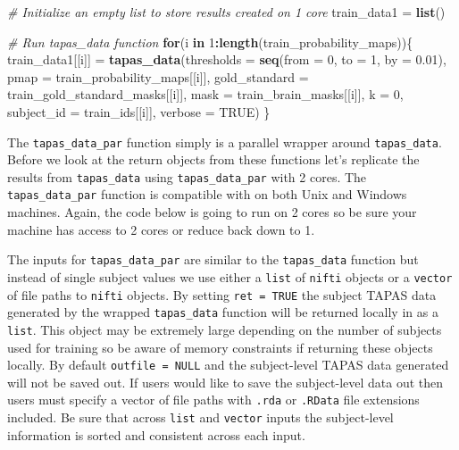 \documentclass[]{article}
\newenvironment{Shaded}{\begin{snugshade}}{\end{snugshade}}
\newcommand{\CommentTok}[1]{\textcolor[rgb]{0.56,0.35,0.01}{\textit{#1}}}
\newcommand{\ControlFlowTok}[1]{\textcolor[rgb]{0.13,0.29,0.53}{\textbf{#1}}}
\newcommand{\DataTypeTok}[1]{\textcolor[rgb]{0.13,0.29,0.53}{#1}}
\newcommand{\DecValTok}[1]{\textcolor[rgb]{0.00,0.00,0.81}{#1}}
\newcommand{\FloatTok}[1]{\textcolor[rgb]{0.00,0.00,0.81}{#1}}
\newcommand{\KeywordTok}[1]{\textcolor[rgb]{0.13,0.29,0.53}{\textbf{#1}}}
\newcommand{\NormalTok}[1]{#1}
\newcommand{\OperatorTok}[1]{\textcolor[rgb]{0.81,0.36,0.00}{\textbf{#1}}}
\newcommand{\OtherTok}[1]{\textcolor[rgb]{0.56,0.35,0.01}{#1}}
\newcommand{\StringTok}[1]{\textcolor[rgb]{0.31,0.60,0.02}{#1}}
\begin{document}
\begin{Shaded}
\begin{Highlighting}[]
\CommentTok{# Initialize an empty list to store results created on 1 core}
\NormalTok{train_data1 =}\StringTok{ }\KeywordTok{list}\NormalTok{()}

\CommentTok{# Run tapas_data function}
\ControlFlowTok{for}\NormalTok{(i }\ControlFlowTok{in} \DecValTok{1}\OperatorTok{:}\KeywordTok{length}\NormalTok{(train_probability_maps))\{}
\NormalTok{  train_data1[[i]] =}\StringTok{ }\KeywordTok{tapas_data}\NormalTok{(}\DataTypeTok{thresholds =} \KeywordTok{seq}\NormalTok{(}\DataTypeTok{from =} \DecValTok{0}\NormalTok{, }\DataTypeTok{to =} \DecValTok{1}\NormalTok{, }\DataTypeTok{by =} \FloatTok{0.01}\NormalTok{),}
                         \DataTypeTok{pmap =}\NormalTok{ train_probability_maps[[i]],}
                         \DataTypeTok{gold_standard =}\NormalTok{ train_gold_standard_masks[[i]],}
                         \DataTypeTok{mask =}\NormalTok{ train_brain_masks[[i]],}
                         \DataTypeTok{k =} \DecValTok{0}\NormalTok{,}
                         \DataTypeTok{subject_id =}\NormalTok{ train_ids[[i]],}
                         \DataTypeTok{verbose =} \OtherTok{TRUE}\NormalTok{)}
\NormalTok{\}}
\end{Highlighting}
\end{Shaded}

The \texttt{tapas\_data\_par} function simply is a parallel wrapper
around \texttt{tapas\_data}. Before we look at the return objects from
these functions let's replicate the results from \texttt{tapas\_data}
using \texttt{tapas\_data\_par} with 2 cores. The
\texttt{tapas\_data\_par} function is compatible with on both Unix and
Windows machines. Again, the code below is going to run on 2 cores so be
sure your machine has access to 2 cores or reduce back down to 1.

The inputs for \texttt{tapas\_data\_par} are similar to the
\texttt{tapas\_data} function but instead of single subject values we
use either a \texttt{list} of \texttt{nifti} objects or a
\texttt{vector} of file paths to \texttt{nifti} objects. By setting
\texttt{ret\ =\ TRUE} the subject TAPAS data generated by the wrapped
\texttt{tapas\_data} function will be returned locally in as a
\texttt{list}. This object may be extremely large depending on the
number of subjects used for training so be aware of memory constraints
if returning these objects locally. By default \texttt{outfile\ =\ NULL}
and the subject-level TAPAS data generated will not be saved out. If
users would like to save the subject-level data out then users must
specify a vector of file paths with \texttt{.rda} or \texttt{.RData}
file extensions included. Be sure that across \texttt{list} and
\texttt{vector} inputs the subject-level information is sorted and
consistent across each input.
\end{document}
